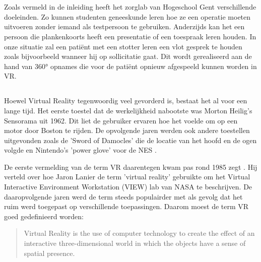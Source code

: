 \chapter{}%
\label{ch:stand-van-zaken}



Zoals vermeld in de inleiding heeft het zorglab van Hogeschool Gent verschillende doeleinden. Zo kunnen studenten geneeskunde leren hoe ze een operatie moeten uitvoeren zonder iemand als testpersoon te gebruiken. Anderzijds kan het een persoon die plankenkoorts heeft een presentatie of een toespraak leren houden. In onze situatie zal een patiënt met een stotter leren een vlot gesprek te houden zoals bijvoorbeeld wanneer hij op sollicitatie gaat. Dit wordt gerealiseerd aan de hand van 360° opnames die voor de patiënt opnieuw afgespeeld kunnen worden in VR.

\section{}%
Hoewel Virtual Reality tegenwoordig veel gevorderd is, bestaat het al voor een lange tijd. Het eerste toestel dat de werkelijkheid nabootste was Morton Heilig’s Sensorama uit 1962. Dit liet de gebruiker ervaren hoe het voelde om op een motor door Boston te rijden. De opvolgende jaren werden ook andere toestellen uitgevonden zoals de 'Sword of Damocles' die de locatie van het hoofd en de ogen volgde en Nintendo's 'power glove' voor de NES \autocite{Boas2012}.

De eerste vermelding van de term VR daarentegen kwam pas rond 1985 zegt \textcite{Bryson2013}. Hij verteld over hoe Jaron Lanier de term 'virtual reality' gebruikte om het Virtual Interactive Environment Workstation (VIEW) lab van NASA te beschrijven. De daaropvolgende jaren werd de term steeds populairder met als gevolg dat het ruim werd toegepast op verschillende toepassingen. Daarom moest de term VR goed gedefinieerd worden:

\begin{quote}
    Virtual Reality is the use of computer technology to create the effect of an
    interactive three-dimensional world in which the objects have a sense of spatial
    presence. \autocite{Bryson2013}
\end{quote}

